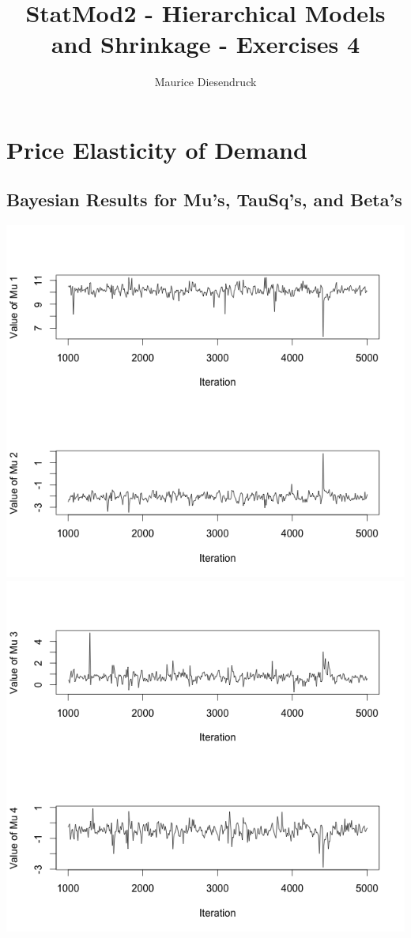 \documentclass[12pt,letterpaper]{article}\usepackage[]{graphicx}\usepackage[]{color}
\author{Maurice Diesendruck\vspace{-2ex}}
\title{StatMod2 - Hierarchical Models and Shrinkage - Exercises 4\vspace{-1ex}}
\begin{document}
\maketitle
\setcounter{section}{1}

\section{Price Elasticity of Demand}
\subsection{Bayesian Results for Mu's, TauSq's, and Beta's}
\includegraphics[width=\textwidth]{new-mu1.png}
\includegraphics[width=\textwidth]{new-mu2.png}
\end{document}
